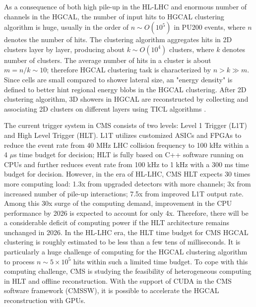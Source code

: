 As a consequence of both high pile-up in the HL-LHC and enormous number of channels in the HGCAL, the number of input hits to HGCAL clustering algorithm is huge, usually in the order of $n\sim O(10^5)$ in PU200 events, where $n$ denotes the number of hits. The clustering algorithm aggregates hits in 2D clusters layer by layer, producing about $k \sim O(10^4)$ clusters, where $k$ denotes number of clusters. The average number of hits in a cluster is about $m=n/k \sim 10$; therefore HGCAL clustering task is characterized by $n> k \gg m$. Since cells are small compared to shower lateral size, an "energy density" is defined to better hint regional energy blobs in the HGCAL clustering. After 2D clustering algorithm, 3D showers in HGCAL are reconstructed by collecting and associating 2D clusters on different layers using TICL algorithms \cite{ticlwebsite}. 

The current trigger system in CMS consists of two levels: Level 1 Trigger (L1T) and High Level Trigger (HLT). L1T utilizes customized ASICs and FPGAs to reduce the event rate from 40 MHz LHC collision frequency to 100 kHz within a 4 $\mu$s time budget for decision; HLT is fully based on C++ software running on CPUs and further reduces event rate from 100 kHz to 1 kHz with a 300 ms time budget for decision. However, in the era of HL-LHC, CMS HLT expects 30 times more computing load: 1.3x from upgraded detectors with more channels; 3x from increased number of pile-up interactions; 7.5x from improved L1T output rate. Among this 30x surge of the computing demand, improvement in the CPU performance by 2026 is expected to account for only 4x. Therefore, there will be a considerable deficit of computing power if the HLT architecture remains unchanged in 2026. In the HL-LHC era, the HLT time budget for CMS HGCAL clustering is roughly estimated to be less than a few tens of milliseconds. It is particularly a huge challenge of computing for the HGCAL clustering algorithm to process $n\sim5\times10^5$ hits within such a limited time budget. To cope with this computing challenge, CMS is studying the feasibility of heterogeneous computing in HLT and offline reconstruction. With the support of CUDA \cite{nvidia2011nvidia} in the CMS software framework (CMSSW), it is possible to accelerate the HGCAL reconstruction with GPUs. 